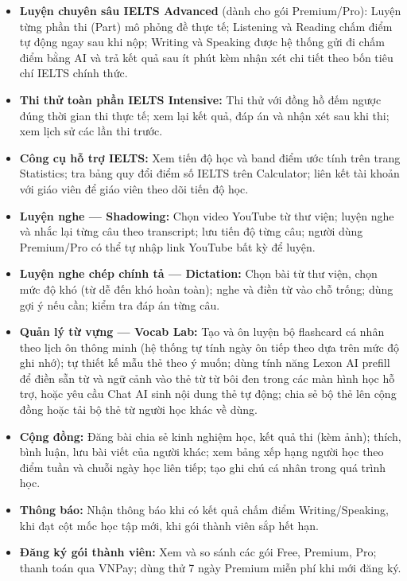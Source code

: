 \begin{itemize}
    \item \textbf{Luyện chuyên sâu IELTS Advanced} (dành cho gói Premium/Pro): Luyện từng phần thi (Part) mô phỏng đề thực tế; Listening và Reading chấm điểm tự động ngay sau khi nộp; Writing và Speaking được hệ thống gửi đi chấm điểm bằng AI và trả kết quả sau ít phút kèm nhận xét chi tiết theo bốn tiêu chí IELTS chính thức.

    \item \textbf{Thi thử toàn phần IELTS Intensive:} Thi thử với đồng hồ đếm ngược đúng thời gian thi thực tế; xem lại kết quả, đáp án và nhận xét sau khi thi; xem lịch sử các lần thi trước.

    \item \textbf{Công cụ hỗ trợ IELTS:} Xem tiến độ học và band điểm ước tính trên trang Statistics; tra bảng quy đổi điểm số IELTS trên Calculator; liên kết tài khoản với giáo viên để giáo viên theo dõi tiến độ học.

    \item \textbf{Luyện nghe --- Shadowing:} Chọn video YouTube từ thư viện; luyện nghe và nhắc lại từng câu theo transcript; lưu tiến độ từng câu; người dùng Premium/Pro có thể tự nhập link YouTube bất kỳ để luyện.

    \item \textbf{Luyện nghe chép chính tả --- Dictation:} Chọn bài từ thư viện, chọn mức độ khó (từ dễ đến khó hoàn toàn); nghe và điền từ vào chỗ trống; dùng gợi ý nếu cần; kiểm tra đáp án từng câu.

    \item \textbf{Quản lý từ vựng --- Vocab Lab:} Tạo và ôn luyện bộ flashcard cá nhân theo lịch ôn thông minh (hệ thống tự tính ngày ôn tiếp theo dựa trên mức độ ghi nhớ); tự thiết kế mẫu thẻ theo ý muốn; dùng tính năng Lexon AI prefill để điền sẵn từ và ngữ cảnh vào thẻ từ từ bôi đen trong các màn hình học hỗ trợ, hoặc yêu cầu Chat AI sinh nội dung thẻ tự động; chia sẻ bộ thẻ lên cộng đồng hoặc tải bộ thẻ từ người học khác về dùng.

    \item \textbf{Cộng đồng:} Đăng bài chia sẻ kinh nghiệm học, kết quả thi (kèm ảnh); thích, bình luận, lưu bài viết của người khác; xem bảng xếp hạng người học theo điểm tuần và chuỗi ngày học liên tiếp; tạo ghi chú cá nhân trong quá trình học.

    \item \textbf{Thông báo:} Nhận thông báo khi có kết quả chấm điểm Writing/Speaking, khi đạt cột mốc học tập mới, khi gói thành viên sắp hết hạn.

    \item \textbf{Đăng ký gói thành viên:} Xem và so sánh các gói Free, Premium, Pro; thanh toán qua VNPay; dùng thử 7 ngày Premium miễn phí khi mới đăng ký.
\end{itemize}

